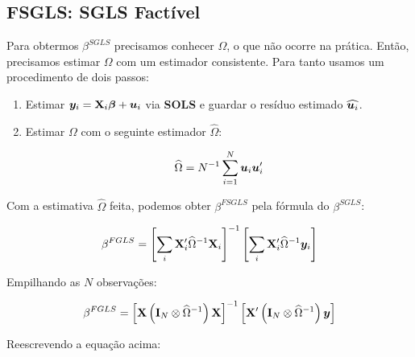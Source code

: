 \documentclass[11pt, oneside, a4paper, article]{article}
\numberwithin{equation}{section}
\begin{document}
\begin{description}
	\noindent
	\citet[Sec.7.5 -- Feasible GLS, p.153]{wool-2010} 

	\subsection{FSGLS: SGLS Factível}

	Para obtermos $\beta^{SGLS}$ precisamos conhecer $\Omega$, o que não ocorre na prática.
	Então, precisamos estimar $\Omega$ com um estimador consistente.
	Para tanto usamos um procedimento de dois passos:

	\begin{enumerate}
		\item  %
			Estimar $\boldsymbol{y}_{i} = \mathbf{X}_{i} \boldsymbol{\beta} + \boldsymbol{u}_{i}$ via \textbf{SOLS} e guardar o resíduo estimado $\widehat{\boldsymbol{u}_{i}}$.

		\item  %
			Estimar $\Omega$ com o seguinte estimador $\widehat{\Omega}$:

			\vspace{-1.5 em}
			\begin{align*}
				\widehat{\Omega} 
				= 
				N^{-1} \sum_{i=1}^{N} \boldsymbol{u}_{i} \boldsymbol{u}_{i}'
			\end{align*}
	\end{enumerate}

	Com a estimativa $\widehat{\Omega}$ feita, podemos obter $\beta^{FSGLS}$ pela fórmula do $\beta^{SGLS}$:

	\vspace{-1.5 em}
	\begin{align*}
		\beta^{FGLS}
		= 
		\left[ 
			\sum_{i} \mathbf{X}_{i}' \widehat{\Omega}^{-1} \mathbf{X}_{i}
		\right]^{-1}
		\left[ 
			\sum_{i} \mathbf{X}_{i}' \widehat{\Omega}^{-1} \boldsymbol{y}_{i}
		\right]
	\end{align*}

	Empilhando as $N$ observações:

	\vspace{-1.5 em}
	\begin{align*}
		\beta^{FGLS}
		= 
		\left[ \mathbf{X} \left( \mathbf{I}_{N} \otimes \widehat{\Omega}^{-1} \right) \mathbf{X} \right]^{-1}
		\left[ \mathbf{X}' \left( \mathbf{I}_{N} \otimes \widehat{\Omega}^{-1} \right) \boldsymbol{y} \right]
	\end{align*}

	Reescrevendo a equação acima:


\end{description}
\end{document}
